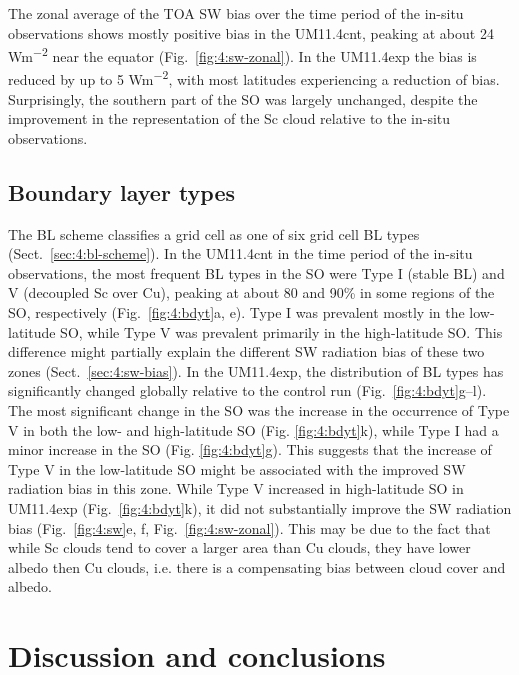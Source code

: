 The zonal average of the TOA SW bias over the time period of the in-situ
observations shows mostly positive bias in the
UM11.4cnt, peaking at about 24 \unit{Wm^{-2}} near the equator (Fig.~\ref{fig:4:sw-zonal}). In the
UM11.4exp the bias is reduced by up to 5 \unit{Wm^{-2}}, with most
latitudes experiencing a reduction of bias. Surprisingly, the southern
part of the SO was largely unchanged, despite the improvement in the
representation of the Sc cloud relative to the in-situ observations.

\subsection{Boundary layer types}
\label{sec:4:bl-types}


The BL scheme classifies a grid cell as one of six grid cell BL types
(Sect.~\ref{sec:4:bl-scheme}). In the UM11.4cnt in the time period of the in-situ observations,
the most frequent BL types in the SO were Type I (stable BL) and V (decoupled Sc
over Cu), peaking at about 80 and 90\% in some regions of the SO, respectively
(Fig.~\ref{fig:4:bdyt}a, e).
Type I was prevalent mostly in the low-latitude SO, while Type V was
prevalent primarily in the high-latitude SO. This difference might partially explain
the different SW radiation bias of these two zones (Sect.~\ref{sec:4:sw-bias}). %
In the UM11.4exp, the distribution of BL types has significantly changed
globally relative to the control run (Fig.~\ref{fig:4:bdyt}g--l). The most significant change in the SO
was the increase in the occurrence of Type V in both the low- and high-latitude SO (Fig.
\ref{fig:4:bdyt}k), while Type I had a minor increase in the SO (Fig.
\ref{fig:4:bdyt}g). This suggests that the increase of Type V in the low-latitude
SO might be associated with the improved SW radiation bias in this zone.
While Type V increased in high-latitude SO in UM11.4exp (Fig.~\ref{fig:4:bdyt}k),
it did not substantially improve the SW radiation bias (Fig.~\ref{fig:4:sw}e, f, Fig.~\ref{fig:4:sw-zonal}).
This may be due to the fact that while Sc clouds tend to cover a larger area
than Cu clouds, they have lower albedo then Cu clouds, i.e. there is a
compensating bias between cloud cover and albedo.

\section{Discussion and conclusions}
\label{sec:4:conclusions}

